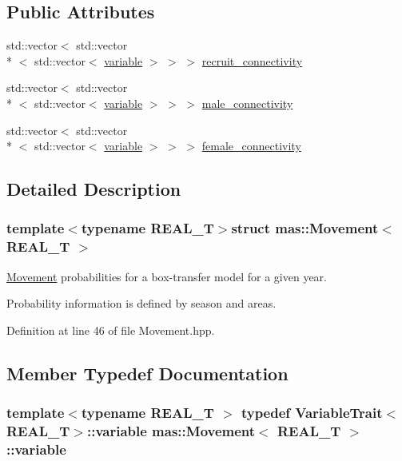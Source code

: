 \subsection*{Public Attributes}
\begin{DoxyCompactItemize}
\item 
std\-::vector$<$ std\-::vector\\*
$<$ std\-::vector$<$ \hyperlink{structmas_1_1_movement_a4667a4bb2ad370d0cf6b476eb625288e}{variable} $>$ $>$ $>$ \hyperlink{structmas_1_1_movement_a07f5b43bad4f99ee026a0b8d3d354049}{recruit\-\_\-connectivity}
\item 
std\-::vector$<$ std\-::vector\\*
$<$ std\-::vector$<$ \hyperlink{structmas_1_1_movement_a4667a4bb2ad370d0cf6b476eb625288e}{variable} $>$ $>$ $>$ \hyperlink{structmas_1_1_movement_aa48b8bad16dfcbca315467a7a7c6ea95}{male\-\_\-connectivity}
\item 
std\-::vector$<$ std\-::vector\\*
$<$ std\-::vector$<$ \hyperlink{structmas_1_1_movement_a4667a4bb2ad370d0cf6b476eb625288e}{variable} $>$ $>$ $>$ \hyperlink{structmas_1_1_movement_a5425a809307c33799cd4c0fee06d54f1}{female\-\_\-connectivity}
\end{DoxyCompactItemize}


\subsection{Detailed Description}
\subsubsection*{template$<$typename R\-E\-A\-L\-\_\-\-T$>$struct mas\-::\-Movement$<$ R\-E\-A\-L\-\_\-\-T $>$}

\hyperlink{structmas_1_1_movement}{Movement} probabilities for a box-\/transfer model for a given year.

Probability information is defined by season and areas. 

Definition at line 46 of file Movement.\-hpp.



\subsection{Member Typedef Documentation}
\hypertarget{structmas_1_1_movement_a4667a4bb2ad370d0cf6b476eb625288e}{
\subsubsection[{variable}]{\setlength{\rightskip}{0pt plus 5cm}template$<$typename R\-E\-A\-L\-\_\-\-T $>$ typedef {\bf Variable\-Trait}$<$R\-E\-A\-L\-\_\-\-T$>$\-::{\bf variable} {\bf mas\-::\-Movement}$<$ R\-E\-A\-L\-\_\-\-T $>$\-::{\bf variable}}}\label{structmas_1_1_movement_a4667a4bb2ad370d0cf6b476eb625288e}



